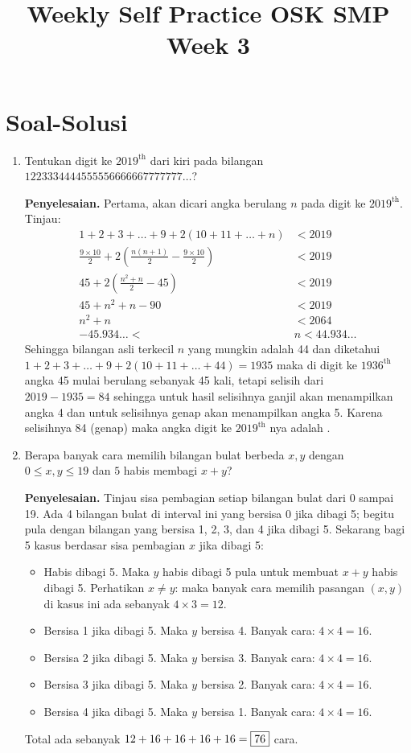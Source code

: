 \documentclass[12pt]{scrartcl}
\begin{document}
\renewcommand*\contentsname{Daftar Isi}
\tableofcontents

\newpage
\title{Weekly Self Practice OSK SMP Week 3}
\section*{Soal-Solusi}

\begin{enumerate}
    \item Tentukan digit ke $2019^{\text{th}}$ dari kiri pada bilangan $1223334444555556666667777777\dots$?
    
    \textbf{Penyelesaian.} Pertama, akan dicari angka berulang $n$ pada digit ke $2019^{\text{th}}$. Tinjau:
    \begin{align*}
        1+2+3+\dots+9+2(10+11+\dots+n) &< 2019 \\
        \frac{9 \times 10}{2} + 2\left(\frac{n(n+1)}{2} - \frac{9 \times 10}{2}\right) &< 2019 \\
        45 + 2\left(\frac{n^2+n}{2} - 45\right) &< 2019 \\
        45 + n^2 + n - 90 &< 2019 \\
        n^2 + n &< 2064 \\
        -45.934\dots < &n < 44.934\dots
    \end{align*}
    Sehingga bilangan asli terkecil $n$ yang mungkin adalah 44 dan diketahui $1+2+3+\dots+9+2(10+11+\dots+44)=1935$ maka di digit ke $1936^{\text{th}}$ angka 45 mulai berulang sebanyak 45 kali, tetapi selisih dari $2019-1935=84$ sehingga untuk hasil selisihnya ganjil akan menampilkan angka 4 dan untuk selisihnya genap akan menampilkan angka 5. Karena selisihnya 84 (genap) maka angka digit ke $2019^{\text{th}}$ nya adalah .
    
    \item Berapa banyak cara memilih bilangan bulat berbeda $x, y$ dengan $0 \le x, y \le 19$ dan $5$ habis membagi $x+y$?
    
    \textbf{Penyelesaian.} Tinjau sisa pembagian setiap bilangan bulat dari 0 sampai 19. Ada 4 bilangan bulat di interval ini yang bersisa 0 jika dibagi 5; begitu pula dengan bilangan yang bersisa 1, 2, 3, dan 4 jika dibagi 5. Sekarang bagi 5 kasus berdasar sisa pembagian $x$ jika dibagi 5:
    \begin{itemize}
        \item Habis dibagi 5. Maka $y$ habis dibagi 5 pula untuk membuat $x+y$ habis dibagi 5. Perhatikan $x \ne y$: maka banyak cara memilih pasangan $(x, y)$ di kasus ini ada sebanyak $4 \times 3 = 12$.
        \item Bersisa 1 jika dibagi 5. Maka $y$ bersisa 4. Banyak cara: $4 \times 4 = 16$.
        \item Bersisa 2 jika dibagi 5. Maka $y$ bersisa 3. Banyak cara: $4 \times 4 = 16$.
        \item Bersisa 3 jika dibagi 5. Maka $y$ bersisa 2. Banyak cara: $4 \times 4 = 16$.
        \item Bersisa 4 jika dibagi 5. Maka $y$ bersisa 1. Banyak cara: $4 \times 4 = 16$.
    \end{itemize}
    Total ada sebanyak $12+16+16+16+16 = \fbox{76}$ cara.
    

\end{enumerate}
\end{document}
